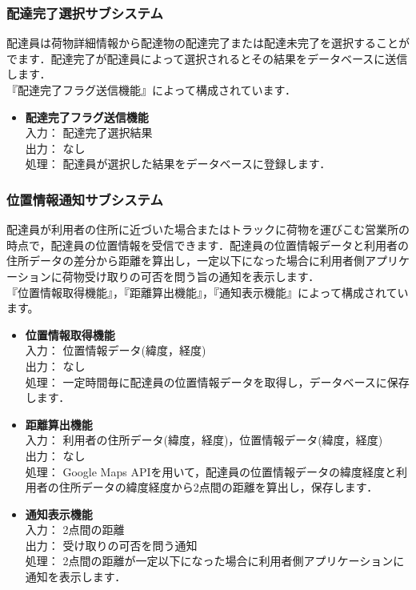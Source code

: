 \documentclass[a4j,titlepage]{jarticle}
\begin{document}
\subsubsection{配達完了選択サブシステム}
配達員は荷物詳細情報から配達物の配達完了または配達未完了を選択することがでます．配達完了が配達員によって選択されるとその結果をデータベースに送信します．\\
『配達完了フラグ送信機能』によって構成されています．
\begin{itemize}
\item \textbf{配達完了フラグ送信機能} \\
入力： 配達完了選択結果\\
出力： なし \\
処理： 配達員が選択した結果をデータベースに登録します．
\end{itemize}

\subsubsection{位置情報通知サブシステム}
配達員が利用者の住所に近づいた場合またはトラックに荷物を運びこむ営業所の時点で，配達員の位置情報を受信できます．配達員の位置情報データと利用者の住所データの差分から距離を算出し，一定以下になった場合に利用者側アプリケーションに荷物受け取りの可否を問う旨の通知を表示します．\\
『位置情報取得機能』，『距離算出機能』，『通知表示機能』によって構成されています。
\begin{itemize}
\item \textbf{位置情報取得機能} \\
入力： 位置情報データ(緯度，経度) \\
出力： なし \\
処理： 一定時間毎に配達員の位置情報データを取得し，データベースに保存します．
\item \textbf{距離算出機能} \\
入力： 利用者の住所データ(緯度，経度)，位置情報データ(緯度，経度) \\
出力： なし \\
処理： Google Maps APIを用いて，配達員の位置情報データの緯度経度と利用者の住所データの緯度経度から2点間の距離を算出し，保存します．
\item \textbf{通知表示機能} \\
入力： 2点間の距離 \\
出力： 受け取りの可否を問う通知 \\
処理： 2点間の距離が一定以下になった場合に利用者側アプリケーションに通知を表示します．
\end{itemize}
\end{document}
